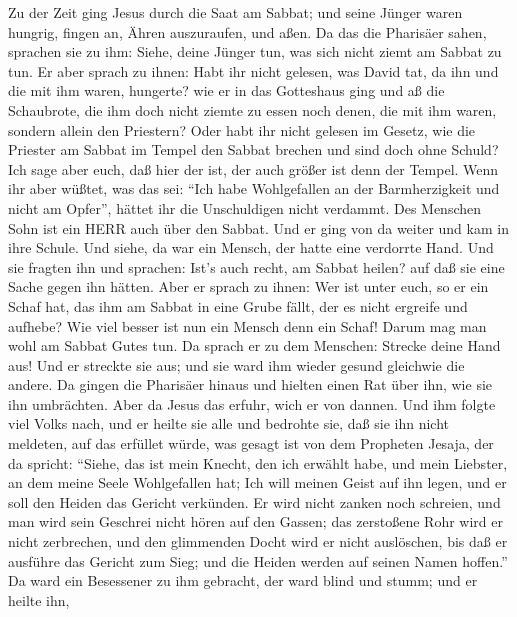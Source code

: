  Zu der Zeit ging Jesus durch die Saat am Sabbat; und seine
Jünger waren hungrig, fingen an, Ähren auszuraufen, und aßen.
 Da das die Pharisäer sahen, sprachen sie zu ihm: Siehe,
deine Jünger tun, was sich nicht ziemt am Sabbat zu tun.  Er
aber sprach zu ihnen: Habt ihr nicht gelesen, was David tat, da ihn und
die mit ihm waren, hungerte?  wie er in das Gotteshaus ging
und aß die Schaubrote, die ihm doch nicht ziemte zu essen noch denen,
die mit ihm waren, sondern allein den Priestern?  Oder habt
ihr nicht gelesen im Gesetz, wie die Priester am Sabbat im Tempel den
Sabbat brechen und sind doch ohne Schuld?  Ich sage aber
euch, daß hier der ist, der auch größer ist denn der Tempel.
 Wenn ihr aber wüßtet, was das sei: ``Ich habe Wohlgefallen
an der Barmherzigkeit und nicht am Opfer'', hättet ihr die Unschuldigen
nicht verdammt.  Des Menschen Sohn ist ein HERR auch über
den Sabbat.  Und er ging von da weiter und kam in ihre
Schule.  Und siehe, da war ein Mensch, der hatte eine
verdorrte Hand. Und sie fragten ihn und sprachen: Ist's auch recht, am
Sabbat heilen? auf daß sie eine Sache gegen ihn hätten. 
Aber er sprach zu ihnen: Wer ist unter euch, so er ein Schaf hat, das
ihm am Sabbat in eine Grube fällt, der es nicht ergreife und aufhebe?
 Wie viel besser ist nun ein Mensch denn ein Schaf! Darum
mag man wohl am Sabbat Gutes tun.  Da sprach er zu dem
Menschen: Strecke deine Hand aus! Und er streckte sie aus; und sie ward
ihm wieder gesund gleichwie die andere.  Da gingen die
Pharisäer hinaus und hielten einen Rat über ihn, wie sie ihn umbrächten.
 Aber da Jesus das erfuhr, wich er von dannen. Und ihm
folgte viel Volks nach, und er heilte sie alle  und
bedrohte sie, daß sie ihn nicht meldeten,  auf das erfüllet
würde, was gesagt ist von dem Propheten Jesaja, der da spricht:
 ``Siehe, das ist mein Knecht, den ich erwählt habe, und
mein Liebster, an dem meine Seele Wohlgefallen hat; Ich will meinen
Geist auf ihn legen, und er soll den Heiden das Gericht verkünden.
 Er wird nicht zanken noch schreien, und man wird sein
Geschrei nicht hören auf den Gassen;  das zerstoßene Rohr
wird er nicht zerbrechen, und den glimmenden Docht wird er nicht
auslöschen, bis daß er ausführe das Gericht zum Sieg;  und
die Heiden werden auf seinen Namen hoffen.''  Da ward ein
Besessener zu ihm gebracht, der ward blind und stumm; und er heilte ihn,

